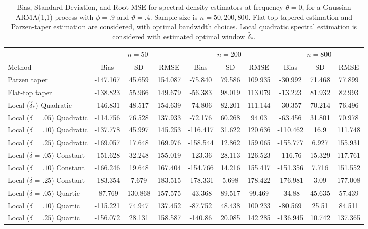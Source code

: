 \documentclass[12p E.Lt,psfig]{article} %
\begin{document}
\begin{table}[ht]
\centering
\begin{footnotesize}
\begin{tabular}{|l|ccc|ccc|ccc|}
  \hline
 \multicolumn{1}{|l|}{} & \multicolumn{3}{c|}{$n=50$}  
   & \multicolumn{3}{c|}{$n=200$}    & \multicolumn{3}{c|}{$n=800$}   \\  \hline \hline
 Method  & Bias & SD & RMSE & Bias & SD & RMSE & Bias & SD & RMSE \\ 
  \hline
Parzen taper & -147.167 & 45.659 & 154.087 & -75.840 & 79.586 & 109.935 & -30.992 & 71.468 & 77.899 \\ 
  Flat-top taper & -138.823 & 55.966 & 149.679 & -56.383 & 98.019 & 113.079 & -13.223 & 81.932 & 82.993 \\ 
Local ($\widehat{\delta}_*$) Quadratic  & -146.831 & 48.517 & 154.639 & -74.806 & 82.201 &
 111.144 & -30.357 & 70.214 & 76.496 \\ 
 \hline
   Local  ($\delta = .05$) Quadratic  & -114.756 & 76.528 & 137.933  &  
   	-72.176 &  60.268 & 94.03 &  -63.456 & 31.801 &  70.978    \\ 
   Local  ($\delta = .10$) Quadratic  & -137.778 & 45.997 & 145.253 & 
   	-116.417 & 31.622 & 120.636  & -110.462 & 16.9 & 111.748   \\ 
   Local  ($\delta = .25$) Quadratic  & -169.057 & 17.648 & 169.976 &  
   	-158.544 & 12.862 & 159.065 &  -155.777 & 6.927 & 155.931   \\ 
\hline
   Local ($\delta = .05$) Constant  &  -151.628 & 32.248 &  155.019  & 
   	-123.36 &  28.113  & 126.523 &  -116.76 & 15.329 & 117.761  \\ 
   Local  ($\delta = .10$) Constant  & -166.246 & 19.648 & 167.404 &  
   	-154.766 & 14.216 & 155.417  & -151.356 & 7.716 & 151.552   \\ 
   Local  ($\delta = .25$) Constant  &  -183.354 & 7.679 & 183.515 &  
   	-178.331 & 5.698 & 178.422  & -176.981 & 3.09 & 177.008   \\ 
\hline
   Local  ($\delta = .05$) Quartic  & -87.769 & 130.868 & 157.575  &
   	-43.368 & 89.517 & 99.469 &  -34.88 & 45.635 & 57.439 \\ 
   Local  ($\delta = .10$) Quartic  & -115.221 & 74.947 & 137.452  &  
   	-87.752 & 48.438 & 100.233 &  -80.569 & 25.51 & 84.511   \\ 
   Local  ($\delta = .25$) Quartic  & -156.072 & 28.131 & 158.587 &
   	-140.86 & 20.085 & 142.285   & -136.945 & 10.742 & 137.365  \\ 
   \hline
\end{tabular}
\end{footnotesize}
\caption{\baselineskip=10pt Bias, Standard Deviation, and Root MSE  for spectral density estimators at frequency $\theta = 0$,
 for a Gaussian ARMA(1,1) process with $\phi = .9$ and $\vartheta = .4$. 
  Sample size is $n= 50,  200,  800$.  
  Flat-top tapered   estimation and Parzen-taper estimation are considered, with optimal bandwidth choices.
 Local quadratic spectral estimation  is      considered 
 with estimated optimal window $\widehat{\delta}_*$.}
\label{table-main:gaussARMA54dgptheta.0}
\end{table}
\end{document}
